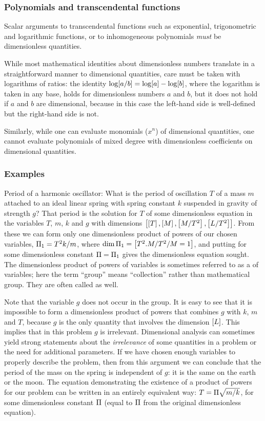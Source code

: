 \subsubsection{Polynomials and transcendental functions}
Scalar arguments to transcendental functions such as exponential, trigonometric and logarithmic functions, or to inhomogeneous polynomials \emph{must} be dimensionless quantities. 

While most mathematical identities about dimensionless numbers translate in a straightforward manner to dimensional quantities, care must be taken with logarithms of ratios: the identity $\log\!\left[{a/b}\right] = \log\!\left[{a}\right] - \log\!\left[{b}\right]$, where the logarithm is taken in any base, holds for dimensionless numbers $a$ and $b$, but it does not hold if $a$ and $b$ are dimensional, because in this case the left-hand side is well-defined but the right-hand side is not.

Similarly, while one can evaluate monomials ($x^n$) of dimensional quantities, one cannot evaluate polynomials of mixed degree with dimensionless coefficients on dimensional quantities.


\subsubsection{Examples}
Period of a harmonic oscillator: What is the period of oscillation $T$ of a mass $m$ attached to an ideal linear spring with spring constant $k$ suspended in gravity of strength $g$? That period is the solution for $T$ of some dimensionless equation in the variables $T$, $m$, $k$ and $g$ with dimensions $\left[{\left[{T}\right], \left[{M}\right], \left[{M/T^2}\right], \left[{L/T^2}\right]}\right]$. From these we can form only one dimensionless product of powers of our chosen variables, $\Pi_1 = T^2 k/m$, where $\dim\Pi_1 = \left[{T^2.M/T^2/M = 1}\right]$, and putting  for some dimensionless constant $\Pi = \Pi_1$ gives the dimensionless equation sought. The dimensionless product of powers of variables is sometimes referred to as a  of variables; here the term ``group'' means ``collection'' rather than mathematical group. They are often called  as well.

Note that the variable $g$ does not occur in the group. It is easy to see that it is impossible to form a dimensionless product of powers that combines $g$ with $k$, $m$ and $T$, because $g$ is the only quantity that involves the dimension $\left[{L}\right]$. This implies that in this problem $g$ is irrelevant. Dimensional analysis can sometimes yield strong statements about the \emph{irrelevance} of some quantities in a problem or the need for additional parameters. If we have chosen enough variables to properly describe the problem, then from this argument we can conclude that the period of the mass on the spring is independent of $g$: it is the same on the earth or the moon. The equation demonstrating the existence of a product of powers for our problem can be written in an entirely equivalent way: $T = \Pi\sqrt{m/k}$, for some dimensionless constant $\Pi$ (equal to $\Pi$ from the original dimensionless equation).

